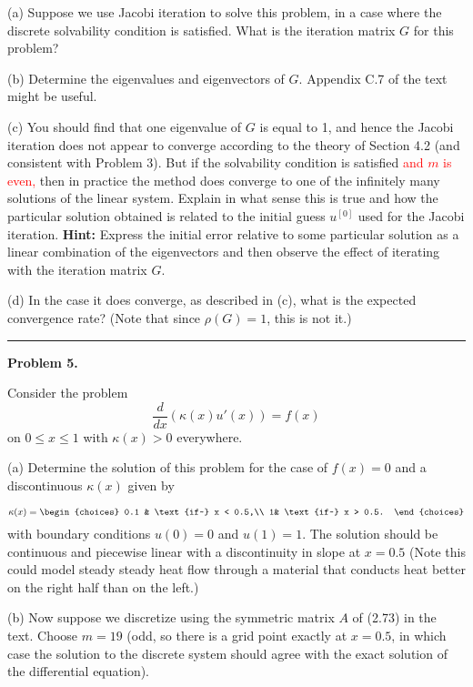 \documentclass[10pt]{article}
\begin{document}
(a) Suppose we use Jacobi iteration to solve this problem, in a case where
the discrete solvability condition is satisfied.  What is the
iteration matrix $G$ for this problem? 

(b) Determine the eigenvalues and eigenvectors of $G$.
Appendix C.7 of the text might be useful.

(c) You should find that one eigenvalue of $G$ is equal to 1, and hence the
Jacobi iteration does not appear to converge according to the theory of
Section 4.2 (and consistent with Problem 3).  
But if the solvability condition is satisfied 
\textcolor{red}{and $m$ is even,} then in practice 
the method does converge to one of the infinitely many solutions of the
linear system.  Explain in what sense this is true and how the particular
solution obtained is related to the initial guess $u^{[0]}$ used for the
Jacobi iteration.
{\bf Hint:} Express the initial error relative to some particular solution
as a linear combination of the eigenvectors and then observe the effect of
iterating with the iteration matrix $G$.

(d) In the case it does converge, as described in (c), what is the
expected convergence rate?  (Note that since $\rho(G)=1$, this is not it.)






\vskip 1cm
\hrule
{\bf Problem 5.}

Consider the problem
\[
\frac{d}{dx}\left(\kappa(x) u'(x)\right) = f(x)
\]
on $0\leq x \leq 1$ with $\kappa(x) >0$ everywhere. 

(a) Determine the solution of this problem for the case of $f(x)=0$ and
a discontinuous $\kappa(x)$ given by

\[
\kappa(x) = \begin{choices}
0.1 & \text{if~}  x < 0.5,\\
1& \text{if~}  x > 0.5.
\end{choices}
\]
with boundary conditions $u(0) = 0$ and $u(1) = 1$. The solution should be
continuous and piecewise linear with a discontinuity in slope at $x=0.5$
(Note this could model steady steady heat flow through a material that
conducts heat better on the right half than on the left.)


(b) Now suppose we discretize using the symmetric matrix $A$ of
(2.73) in the text.  Choose $m=19$ (odd, so there is a grid point exactly
at $x=0.5$, in which case the solution to the discrete system should
agree with the exact solution of the differential equation).
\end{document}
